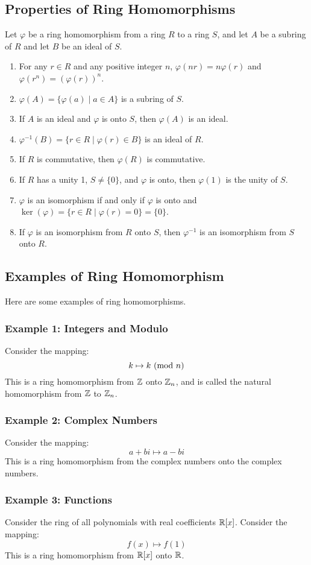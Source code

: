 \documentclass[letterpaper]{article}
\begin{document}
\subsection{Properties of Ring Homomorphisms}
\begin{theorem}{}{}
    Let $\varphi$ be a ring homomorphism from a ring $R$ to a ring $S$, and let $A$ be a subring of $R$ and let $B$ be an ideal of $S$.
    \begin{enumerate}
        \item For any $r \in R$ and any positive integer $n$, $\varphi(nr) = n\varphi(r)$ and $\varphi(r^n) = (\varphi(r))^n$.
        \item $\varphi(A) = \{\varphi(a) \mid a \in A\}$ is a subring of $S$. 
        \item If $A$ is an ideal and $\varphi$ is onto $S$, then $\varphi(A)$ is an ideal. 
        \item $\varphi^{-1}(B) = \{r \in R \mid \varphi(r) \in B\}$ is an ideal of $R$. 
        \item If $R$ is commutative, then $\varphi(R)$ is commutative.
        \item If $R$ has a unity 1, $S \neq \{0\}$, and $\varphi$ is onto, then $\varphi(1)$ is the unity of $S$. 
        \item $\varphi$ is an isomorphism if and only if $\varphi$ is onto and $\ker(\varphi) = \{r \in R \mid \varphi(r) = 0\} = \{0\}$. 
        \item If $\varphi$ is an isomorphism from $R$ onto $S$, then $\varphi^{-1}$ is an isomorphism from $S$ onto $R$. 
    \end{enumerate}
\end{theorem}

\subsection{Examples of Ring Homomorphism}
Here are some examples of ring homomorphisms.

\subsubsection{Example 1: Integers and Modulo}
Consider the mapping: 
\[k \mapsto k \ (\mathrm{mod}\ n)\]
This is a ring homomorphism from $\mathbb{Z}$ onto $\mathbb{Z}_{n}$, and is called the natural homomorphism from $\mathbb{Z}$ to $\mathbb{Z}_{n}$. 

\subsubsection{Example 2: Complex Numbers}
Consider the mapping: 
\[a + bi \mapsto a - bi\]
This is a ring homomorphism from the complex numbers onto the complex numbers. 

\subsubsection{Example 3: Functions}
Consider the ring of all polynomials with real coefficients $\mathbb{R}[x]$. Consider the mapping:
\[f(x) \mapsto f(1)\]
This is a ring homomorphism from $\mathbb{R}[x]$ onto $\mathbb{R}$. 
\end{document}
